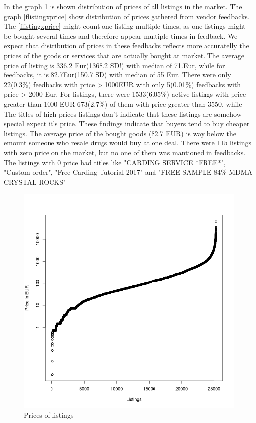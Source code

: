 \documentclass[
  digital, %
  table,   %
  lof,     %
  lot,     %
  oneside
]{fithesis3}
\begin{document}
In the graph \ref{listingxprice} is shown distribution of prices of all listings in
 the market. 
 The graph \ref{flistingxprice} show distribution of prices gathered
 from vendor feedbacks. The \ref{flistingxprice} might count one listing
 multiple times, as one listings might be bought several times
 and therefore appear multiple times in feedback. We expect that distribution
 of prices in these feedbacks reflects more accuratelly the prices of the goods or services
 that are actually bought at market.
 The average price of listing is 336.2 Eur(1368.2 SD!) with median of 71.Eur,
 while for feedbacks, it is 82.7Eur(150.7 SD) with median of 55 Eur.
  There were only 22(0.3\%) feedbacks with price > 1000EUR
 with only 5(0.01\%) feedbacks with price > 2000 Eur.
  For listings, there were 1533(6.05\%) active listings
 with price greater than 1000 EUR
 673(2.7\%) of them with price greater than 3550, while
 The titles of high prices listings don't indicate that 
 these listings are somehow special expect it's price.
 These findings indicate that buyers tend to buy
 cheaper listings. The average price of the bought goods (82.7 EUR)
 is way below the emount someone who resale drugs would buy at one deal.
 There were 115 listings with zero price on the market,
 but no one of them was mantioned in feedbacks.
 The listings with 0 price had titles like "CARDING SERVICE *FREE*",
 "Custom order", "Free Carding Tutorial 2017" and "FREE SAMPLE 84\% MDMA CRYSTAL ROCKS"

\begin{figure}[!htb]
    \centering
    \includegraphics[scale=0.4]{listingxprice}
    \caption{Prices of listings}
    \label{listingxprice}
\end{figure}
\end{document}
